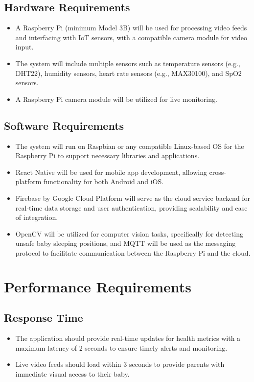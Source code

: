 \documentclass[12pt,a4paper]{report}
\begin{document}
\subsection{Hardware Requirements}
\begin{itemize}
  \item A Raspberry Pi (minimum Model 3B) will be used for processing video feeds and interfacing with IoT sensors, with a compatible camera module for video input.
  \item The system will include multiple sensors such as temperature sensors (e.g., DHT22), humidity sensors, heart rate sensors (e.g., MAX30100), and SpO2 sensors.
  \item A Raspberry Pi camera module will be utilized for live monitoring.
\end{itemize}

\subsection{Software Requirements}
\begin{itemize}
  \item The system will run on Raspbian or any compatible Linux-based OS for the Raspberry Pi to support necessary libraries and applications.
  \item React Native will be used for mobile app development, allowing cross-platform functionality for both Android and iOS\cite{reactnativeIntroductionReact}.
  \item Firebase by Google Cloud Platform will serve as the cloud service backend for real-time data storage and user authentication, providing scalability and ease of integration\cite{googleCloudComputing}\cite{googleFirebaseDocumentation}. 
  \item OpenCV will be utilized for computer vision tasks, specifically for detecting unsafe baby sleeping positions, and MQTT will be used as the messaging protocol to facilitate communication between the Raspberry Pi and the cloud\cite{10187295}\cite{9292052}.
\end{itemize}

\section{Performance Requirements}

\subsection{Response Time}
\begin{itemize}
  \item The application should provide real-time updates for health metrics with a maximum latency of 2 seconds to ensure timely alerts and monitoring.
  \item Live video feeds should load within 3 seconds to provide parents with immediate visual access to their baby.
\end{itemize}
\end{document}
